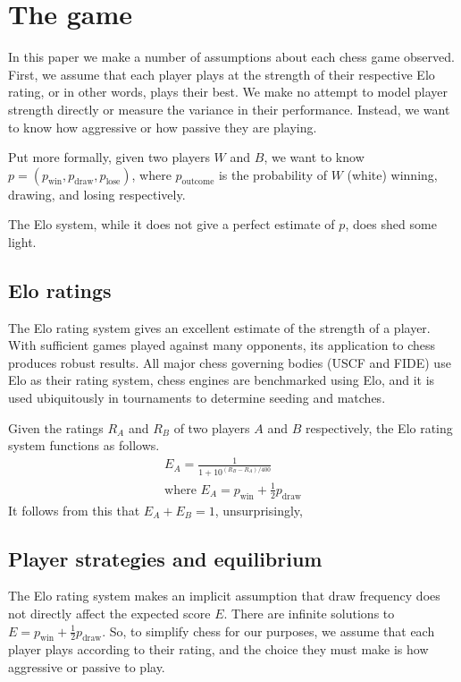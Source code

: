 \documentclass{article}
\begin{document}
\section{The game}

In this paper we make a number of assumptions about each chess game observed.
First, we assume that each player plays at the strength of their respective Elo rating, or
in other words, plays their best. We make no attempt to model player strength directly or
measure the variance in their performance.
Instead, we want to know how aggressive or how passive they are playing.

Put more formally, given two players $W$ and $B$, we want to know
$p=(p_{\text{win}}, p_{\text{draw}}, p_{\text{lose}})$, where $p_{\text{outcome}}$ is
the probability of $W$ (white) winning, drawing, and losing respectively.

The Elo system, while it does not give a perfect estimate of $p$, does shed some light.

\subsection{Elo ratings}
The Elo rating system gives an excellent estimate of the strength of a player.
With sufficient games played against many opponents, its application to chess produces robust results. All major chess governing bodies (USCF and FIDE) use Elo as their rating system,
chess engines are benchmarked using Elo, and it is used ubiquitously in tournaments to determine seeding and matches.

Given the ratings $R_A$ and $R_B$ of two players $A$ and $B$ respectively, the Elo rating system functions as follows.
\begin{align*}
    E_A = \frac{1}{1+10^{(R_B-R_A)/400}} \\
    \text{where } E_A = p_{\text{win}} + \frac{1}{2} p_{\text{draw}}
\end{align*}
It follows from this that $E_A+E_B=1$, unsurprisingly,

\subsection{Player strategies and equilibrium}

The Elo rating system makes an implicit assumption that draw frequency does not directly affect
the expected score $E$.
There are infinite solutions to $E = p_{\text{win}} + \frac{1}{2} p_{\text{draw}}$.
So, to simplify chess for our purposes, we assume that each player plays
according to their rating, and the choice they must make is how aggressive or passive to play.
\end{document}
